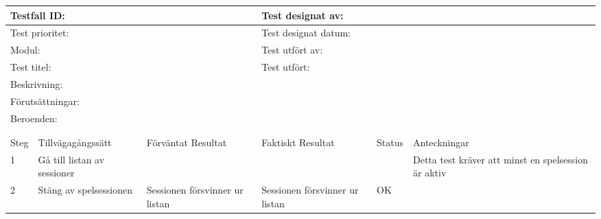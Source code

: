 \documentclass[10pt]{article}
\begin{document}
\begin{tabular}{| p{1cm}|  p{3cm} | p{3cm}| p{3cm}| p{2cm}| p{3cm}|}
	\hline
	  \multicolumn{3}{|l|}{Testfall ID:}&\multicolumn{3}{|l|}{Test designat av:}\\
	  \hline
	  \multicolumn{3}{|l|}{Test prioritet:}&\multicolumn{3}{|l|}{Test designat datum:}\\
	  \hline
	  \multicolumn{3}{|l|}{Modul:}&\multicolumn{3}{|l|}{Test utfört av:}\\
	  \hline
	  \multicolumn{3}{|l|}{Test titel:}&\multicolumn{3}{|l|}{Test utfört:}\\
	  \hline
	  \multicolumn{6}{|p{\textwidth}|}{Beskrivning:}\\
	  \hline
	  \multicolumn{6}{|p{\textwidth}|}{Förutsättningar:}\\
	  \hline
	  \multicolumn{6}{|p{\textwidth}|}{Beroenden:}\\
  
	\hline
	\multicolumn{6}{|l|}{}\\
	\multicolumn{6}{|l|}{}\\
      	\hline
	Steg&Tillvägagångssätt&Förväntat Resultat&Faktiskt Resultat&Status&Anteckningar \\
	\hline
	1&Gå till listan av sessioner&&&&Detta test kräver att minst en spelsession är aktiv\\
      	\hline
	2&Stäng av spelsessionen&Sessionen försvinner ur listan&Sessionen försvinner ur listan&OK&\\
      	\hline
\end{tabular}
\end{document}
